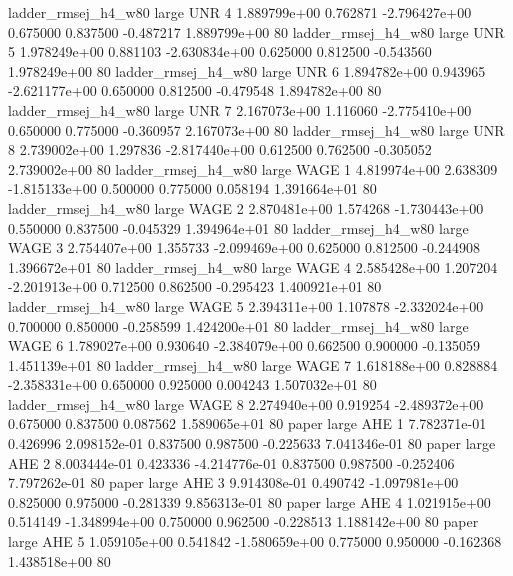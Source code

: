ladder_rmsej_h4_w80      large      UNR                 4 1.889799e+00      0.762871 -2.796427e+00 0.675000 0.837500      -0.487217 1.889799e+00 80
ladder_rmsej_h4_w80      large      UNR                 5 1.978249e+00      0.881103 -2.630834e+00 0.625000 0.812500      -0.543560 1.978249e+00 80
ladder_rmsej_h4_w80      large      UNR                 6 1.894782e+00      0.943965 -2.621177e+00 0.650000 0.812500      -0.479548 1.894782e+00 80
ladder_rmsej_h4_w80      large      UNR                 7 2.167073e+00      1.116060 -2.775410e+00 0.650000 0.775000      -0.360957 2.167073e+00 80
ladder_rmsej_h4_w80      large      UNR                 8 2.739002e+00      1.297836 -2.817440e+00 0.612500 0.762500      -0.305052 2.739002e+00 80
ladder_rmsej_h4_w80      large     WAGE                 1 4.819974e+00      2.638309 -1.815133e+00 0.500000 0.775000       0.058194 1.391664e+01 80
ladder_rmsej_h4_w80      large     WAGE                 2 2.870481e+00      1.574268 -1.730443e+00 0.550000 0.837500      -0.045329 1.394964e+01 80
ladder_rmsej_h4_w80      large     WAGE                 3 2.754407e+00      1.355733 -2.099469e+00 0.625000 0.812500      -0.244908 1.396672e+01 80
ladder_rmsej_h4_w80      large     WAGE                 4 2.585428e+00      1.207204 -2.201913e+00 0.712500 0.862500      -0.295423 1.400921e+01 80
ladder_rmsej_h4_w80      large     WAGE                 5 2.394311e+00      1.107878 -2.332024e+00 0.700000 0.850000      -0.258599 1.424200e+01 80
ladder_rmsej_h4_w80      large     WAGE                 6 1.789027e+00      0.930640 -2.384079e+00 0.662500 0.900000      -0.135059 1.451139e+01 80
ladder_rmsej_h4_w80      large     WAGE                 7 1.618188e+00      0.828884 -2.358331e+00 0.650000 0.925000       0.004243 1.507032e+01 80
ladder_rmsej_h4_w80      large     WAGE                 8 2.274940e+00      0.919254 -2.489372e+00 0.675000 0.837500       0.087562 1.589065e+01 80
              paper      large      AHE                 1 7.782371e-01      0.426996  2.098152e-01 0.837500 0.987500      -0.225633 7.041346e-01 80
              paper      large      AHE                 2 8.003444e-01      0.423336 -4.214776e-01 0.837500 0.987500      -0.252406 7.797262e-01 80
              paper      large      AHE                 3 9.914308e-01      0.490742 -1.097981e+00 0.825000 0.975000      -0.281339 9.856313e-01 80
              paper      large      AHE                 4 1.021915e+00      0.514149 -1.348994e+00 0.750000 0.962500      -0.228513 1.188142e+00 80
              paper      large      AHE                 5 1.059105e+00      0.541842 -1.580659e+00 0.775000 0.950000      -0.162368 1.438518e+00 80
